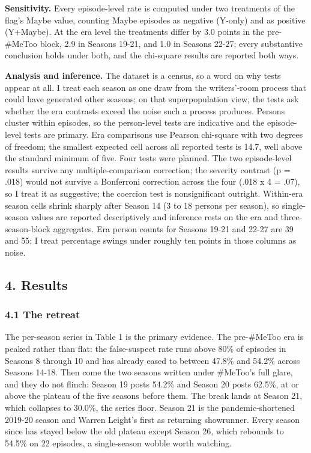 \documentclass[
]{article}
\begin{document}
\textbf{Sensitivity.} Every episode-level rate is computed under two
treatments of the flag's Maybe value, counting Maybe episodes as
negative (Y-only) and as positive (Y+Maybe). At the era level the
treatments differ by 3.0 points in the pre-\#MeToo block, 2.9 in Seasons
19-21, and 1.0 in Seasons 22-27; every substantive conclusion holds
under both, and the chi-square results are reported both ways.

\textbf{Analysis and inference.} The dataset is a census, so a word on
why tests appear at all. I treat each season as one draw from the
writers'-room process that could have generated other seasons; on that
superpopulation view, the tests ask whether the era contrasts exceed the
noise such a process produces. Persons cluster within episodes, so the
person-level tests are indicative and the episode-level tests are
primary. Era comparisons use Pearson chi-square with two degrees of
freedom; the smallest expected cell across all reported tests is 14.7,
well above the standard minimum of five. Four tests were planned. The
two episode-level results survive any multiple-comparison correction;
the severity contrast (p = .018) would not survive a Bonferroni
correction across the four (.018 x 4 = .07), so I treat it as
suggestive; the coercion test is nonsignificant outright. Within-era
season cells shrink sharply after Season 14 (3 to 18 persons per
season), so single-season values are reported descriptively and
inference rests on the era and three-season-block aggregates. Era person
counts for Seasons 19-21 and 22-27 are 39 and 55; I treat percentage
swings under roughly ten points in those columns as noise.

\subsection{4. Results}\label{results}

\subsubsection{4.1 The retreat}\label{the-retreat}

The per-season series in Table 1 is the primary evidence. The
pre-\#MeToo era is peaked rather than flat: the false-suspect rate runs
above 80\% of episodes in Seasons 8 through 10 and has already eased to
between 47.8\% and 54.2\% across Seasons 14-18. Then come the two
seasons written under \#MeToo's full glare, and they do not flinch:
Season 19 posts 54.2\% and Season 20 posts 62.5\%, at or above the
plateau of the five seasons before them. The break lands at Season 21,
which collapses to 30.0\%, the series floor. Season 21 is the
pandemic-shortened 2019-20 season and Warren Leight's first as returning
showrunner. Every season since has stayed below the old plateau except
Season 26, which rebounds to 54.5\% on 22 episodes, a single-season
wobble worth watching.
\end{document}

